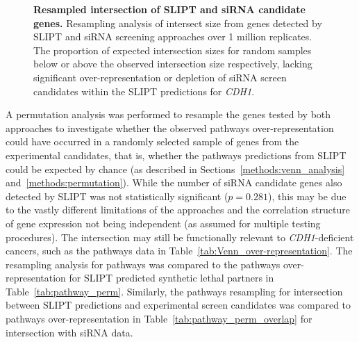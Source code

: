 \begin{figure}[!ht]
  \centering
   \caption[Resampled intersection of SLIPT and siRNA candidate genes]{\small \textbf{Resampled intersection of \gls{SLIPT} and \gls{siRNA} candidate genes.} Resampling analysis of intersect size from genes detected by \gls{SLIPT} and \gls{siRNA} screening approaches over 1 million replicates. The proportion of expected intersection sizes for random samples below or above the observed intersection size respectively, lacking significant over-represent\-ation or depletion of \gls{siRNA} screen candidates within the \gls{SLIPT} predictions for \textit{CDH1}.
}
\label{fig:perm_sample}
\end{figure}

A permutation analysis was performed to resample the genes tested by both approaches to investigate whether the observed \glspl{pathway} over-represent\-ation could have occurred in a randomly selected sample of genes from the experimental candidates, that is, whether the \glspl{pathway} predictions from \gls{SLIPT} could be expected by chance (as described in Sections~\ref{methods:venn_analysis} and~\ref{methods:permutation}).
While the number of \gls{siRNA} candidate genes also detected by \gls{SLIPT} was not statistically significant ($p=0.281$), this may be due to the vastly different limitations of the approaches and the correlation structure of \gls{gene expression} not being independent (as assumed for multiple testing procedures). The  intersection may still be functionally relevant to \textit{CDH1}-deficient cancers, such as the \glspl{pathway} data in Table~\ref{tab:Venn_over-representation}. The resampling analysis for \glspl{pathway} was compared to the \glspl{pathway} over-represent\-ation for \gls{SLIPT} predicted \gls{synthetic lethal} partners in Table~\ref{tab:pathway_perm}. Similarly, the \glspl{pathway} resampling for intersection between \gls{SLIPT} predictions and experimental screen candidates was compared to \glspl{pathway} over-represent\-ation in Table~\ref{tab:pathway_perm_overlap} for intersection with \gls{siRNA} data.

